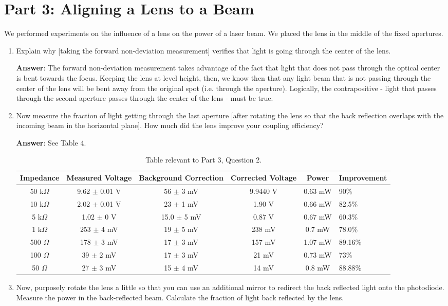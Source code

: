 \documentclass[10pt,a4paper]{article}
\begin{document}
\section*{Part 3: Aligning a Lens to a Beam}
We performed experiments on the influence of a lens on the power of a laser beam. We placed the lens in the middle of the fixed apertures. 
\begin{enumerate}
\item Explain why [taking the forward non-deviation measurement] verifies that light is going through the center of the lens.

\textbf{Answer}: The forward non-deviation measurement takes advantage of the fact that light that does not pass through the optical center is bent towards the focus. Keeping the lens at level height, then, we know then that any light beam that is not passing through the center of the lens will be bent away from the original spot (i.e. through the aperture). Logically, the contrapositive - light that passes through the second aperture passes through the center of the lens - must be true.
\item Now measure the fraction of light getting through the last aperture [after rotating the lens so that the back reflection overlaps with the incoming beam in the horizontal plane]. How much did the lens improve your coupling efficiency?

\textbf{Answer}: See Table 4.

\begin{table}[h]
\centering
\begin{tabular}{|cccccp{2cm}|}
\hline 
Impedance & Measured Voltage & Background Correction & Corrected Voltage & Power & Improvement\footnotemark \\
\hline 
50 k$\Omega$ & 9.62 $\pm$ 0.01 V & 56 $\pm$ 3 mV & 9.9440 V & 0.63 mW & 90\% \\ 
\hline 
10 k$\Omega$ & 2.02 $\pm$ 0.01 V & 23 $\pm$ 1 mV & 1.90 V & 0.66 mW & 82.5\% \\ 
\hline 
5 k$\Omega$ & 1.02 $\pm$ 0 V & 15.0 $\pm$ 5 mV & 0.87 V & 0.67 mW & 60.3\% \\ 
\hline 
1 k$\Omega$ & 253 $\pm$ 4 mV & 19 $\pm$ 5 mV & 238 mV & 0.7 mW & 78.0\% \\ 
\hline 
500 $\Omega$ & 178 $\pm$ 3 mV & 17 $\pm$ 3 mV & 157 mV & 1.07 mW & 89.16\% \\ 
\hline 
100 $\Omega$ & 39 $\pm$ 2 mV & 17 $\pm$ 3 mV & 21 mV & 0.73 mW & 73\%\\ 
\hline 
50 $\Omega$ & 27 $\pm$ 3 mV & 15 $\pm$ 4 mV & 14 mV & 0.8 mW & 88.88\%\\ 
\hline 
\end{tabular}
\caption{Table relevant to Part 3, Question 2.}
\end{table}
\item Now, purposely rotate the lens a little so that you can use an additional mirror to redirect the back reflected light onto the photodiode. Measure the power in the back-reflected beam. Calculate the fraction of light back reflected by the lens.


\end{enumerate}
\end{document}
